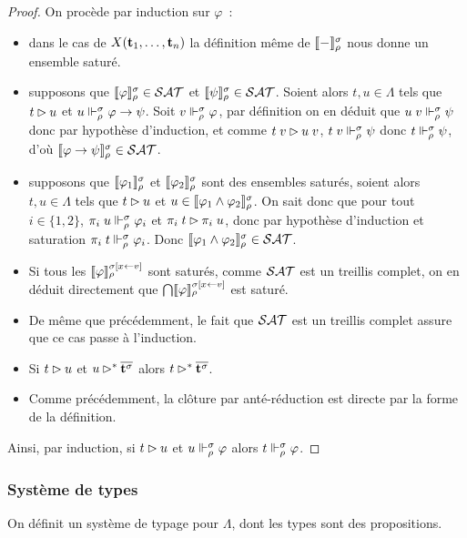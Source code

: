 \documentclass{article}
\begin{document}
\begin{proof}
  On procède par induction sur $\varphi$~:
  \begin{itemize}
  \item dans le cas de $X(\mathbf{t}_1,\ldots,\mathbf{t}_n)$ la définition même de $\llbracket - \rrbracket_\rho^\sigma$ nous donne un ensemble saturé.
  \item supposons que $\llbracket \varphi \rrbracket_\rho^\sigma\in\mathcal {SAT}$ et $\llbracket \psi \rrbracket_\rho^\sigma\in \mathcal {SAT}$. Soient alors $t,u\in\Lambda$ tels que $t\rhd u$ et $u \Vdash_\rho^\sigma \varphi \to \psi$. Soit $v\Vdash_\rho^\sigma\varphi$, par définition on en déduit que $u\;v\Vdash_\rho^\sigma \psi$ donc par hypothèse d'induction, et comme $t\;v\rhd u\;v$, $t\;v\Vdash_\rho^\sigma\psi$ donc $t\Vdash_\rho^\sigma\psi$, d'où $\llbracket \varphi\to\psi \rrbracket_\rho^\sigma \in\mathcal {SAT}$.
  \item supposons que $\llbracket \varphi_1 \rrbracket_\rho^\sigma$ et $\llbracket \varphi_2 \rrbracket_\rho^\sigma$ sont des ensembles saturés, soient alors $t, u \in \Lambda$ tels que $t\rhd u$ et $u \in \llbracket \varphi_1\land \varphi_2 \rrbracket_\rho^\sigma$. On sait donc que pour tout $i\in\{1,2\}$, $\pi_i\;u \Vdash_\rho^\sigma \varphi_i$ et $\pi_i\;t\rhd\pi_i\;u$, donc par hypothèse d'induction et saturation $\pi_i\;t\Vdash_\rho^\sigma\varphi_i$. Donc $\llbracket \varphi_1\land\varphi_2 \rrbracket_\rho^\sigma\in\mathcal {SAT}$.
  \item Si tous les $\llbracket \varphi \rrbracket_\rho^{\sigma[x\leftarrow v]}$ sont saturés, comme $\mathcal {SAT}$ est un treillis complet, on en déduit directement que $\bigcap \llbracket \varphi \rrbracket_\rho^{\sigma[x\leftarrow v]}$ est saturé.
  \item De même que précédemment, le fait que $\mathcal {SAT}$ est un treillis complet assure que ce cas passe à l'induction.
  \item Si $t\rhd u$ et $u\rhd^* \overline{\mathbf{t}^\sigma}$ alors $t\rhd^*\overline{\mathbf{t}^\sigma}$.
  \item Comme précédemment, la clôture par anté-réduction est directe par la forme de la définition.
  \end{itemize}

  Ainsi, par induction, si $t\rhd u$ et $u\Vdash_\rho^\sigma \varphi$ alors $t\Vdash_\rho^\sigma\varphi$.
\end{proof}

\subsubsection{Système de types}

On définit un système de typage pour $\Lambda$, dont les types sont des propositions.
\end{document}
